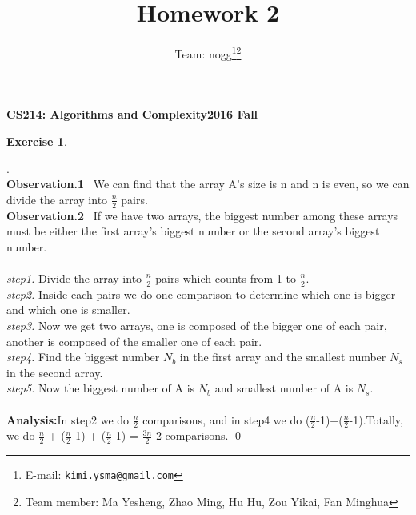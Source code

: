 \documentclass[12pt, notitlepage]{article}
\title{Homework 2}
\author{Team: nogg\footnote{E-mail: \texttt{kimi.ysma@gmail.com}}\footnote{Team member: Ma Yesheng, Zhao Ming, Hu Hu, Zou Yikai, Fan Minghua}}
\newtheorem{ex}{Exercise}
\newenvironment{sol}
  {\par\vspace{3mm}\noindent{\it Solution}.}{\qed}
\begin{document}
{\bf\small CS214: Algorithms and Complexity}\hfill{\bf\small 2016 Fall}
{\let\newpage\relax\maketitle}


\begin{ex}\end{ex}
\begin{sol}\\
\textbf{Observation.1} ~We can find that the array A's size is n and n is even, so  we can divide the array into $\frac{n}{2}$ pairs.\\
\textbf{Observation.2} ~If we have two arrays, the biggest number among these arrays must be either the first array's biggest number or the second array's biggest number.\\\\
\emph{step1.} Divide the array into $\frac{n}{2}$ pairs which counts from 1 to $\frac{n}{2}$. \\
\emph{step2.} Inside each pairs we do one comparison to determine which one is bigger and which one is smaller.\\
\emph{step3.} Now we get two arrays, one is composed of the bigger one of each pair, another is composed of the smaller one of each pair.\\
\emph{step4.} Find the biggest number $N_b$ in the first array and the smallest number $N_s$ in the second array.\\
\emph{step5.} Now the biggest number of A is $N_b$ and smallest number of A is $N_s$. \\\\
\textbf{Analysis:}In step2 we do $\frac{n}{2}$ comparisons, and in step4 we do ($\frac{n}{2}$-1)+($\frac{n}{2}$-1).Totally, we do $\frac{n}{2}$ + ($\frac{n}{2}$-1) + ($\frac{n}{2}$-1) = $\frac{3n}{2}$-2 comparisons.
\end{sol}
\end{document}
